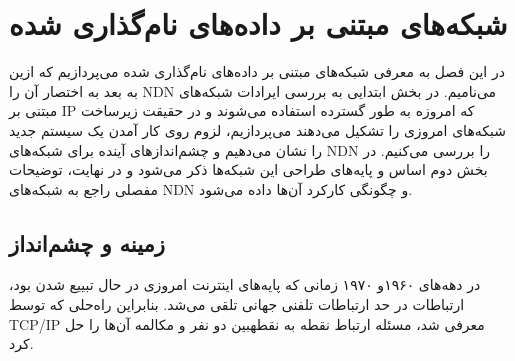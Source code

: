 

\chapter{ شبکه‌های مبتنی بر داده‌های نام‌گذاری شده}
در این فصل به معرفی شبکه‌های مبتنی بر داده‌های نام‌گذاری شده می‌پردازیم که ازین به بعد به اختصار آن را  NDN می‌نامیم.  در بخش ابتدایی به بررسی ایرادات شبکه‌های مبتنی بر IP که امروزه به طور گسترده استفاده می‌شوند و در حقیقت زیرساخت شبکه‌های امروزی را تشکیل می‌دهند می‌پردازیم، لزوم روی کار آمدن یک سیستم جدید را نشان می‌دهیم و چشم‌اندازهای آینده برای شبکه‌های NDN را بررسی می‌کنیم. در بخش دوم اساس و پایه‌های طراحی این شبکه‌ها ذکر می‌شود و در نهایت، توضیحات مفصلی راجع به شبکه‌های NDN و چگونگی کارکرد آن‌ها داده می‌شود. 

\section{زمینه و چشم‌انداز}

در دهه‌‌های ۱۹۶۰و ۱۹۷۰ زمانی که پایه‌‌های اینترنت امروزی در حال تبییع شدن بود، ارتباطات در حد ارتباطات تلفنی جهانی تلقی می‌شد. بنابراین راه‌حلی که توسط TCP/IP معرفی شد، مسئله ارتباط نقطه به نقطهبین دو نفر و مکالمه آن‌ها را حل کرد. 




